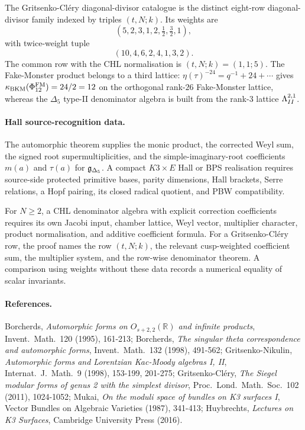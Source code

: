 The Gritsenko-Cl\'ery diagonal-divisor catalogue is the distinct
eight-row diagonal-divisor family indexed by triples \((t,N;k)\). Its
weights are
\[
  (5,2,3,1,2,\tfrac12,\tfrac32,1),
\]
with twice-weight tuple
\[
  (10,4,6,2,4,1,3,2).
\]
The common row with the CHL normalisation is \((t,N;k)=(1,1;5)\). The
Fake-Monster product belongs to a third lattice:
\(\eta(\tau)^{-24}=q^{-1}+24+\cdots\) gives
\(\kappa_{\mathrm{BKM}}(\Phi_{12}^{\mathrm{FM}})=24/2=12\) on the orthogonal
rank-\(26\) Fake-Monster lattice, whereas the \(\Delta_5\) type-II
denominator algebra is built from the rank-\(3\) lattice \(\Lambda^{2,1}_{II}\).

\paragraph{Hall source-recognition data.}
The automorphic theorem supplies the monic product, the corrected Weyl
sum, the signed root supermultiplicities, and the simple-imaginary-root
coefficients \(m(a)\) and \(\tau(a)\) for \(\mathfrak g_{\Delta_5}\). A compact
\(K3\times E\) Hall or BPS realisation requires source-side protected
primitive bases, parity dimensions, Hall brackets, Serre relations, a
Hopf pairing, its closed radical quotient, and PBW compatibility.

For \(N\geq2\), a CHL denominator algebra with explicit correction
coefficients requires its own Jacobi input, chamber lattice, Weyl
vector, multiplier character, product normalisation, and additive
coefficient formula. For a Gritsenko-Cl\'ery row, the proof names
the row \((t,N;k)\), the relevant cusp-weighted coefficient sum, the
multiplier system, and the row-wise denominator theorem. A comparison
using weights without these data records a numerical equality of scalar
invariants.

\paragraph{References.}
Borcherds, \emph{Automorphic forms on \(O_{s+2,2}(\mathbb R)\) and
infinite products}, Invent.\ Math.\ 120 (1995), 161-213; Borcherds,
\emph{The singular theta correspondence and automorphic forms},
Invent.\ Math.\ 132 (1998), 491-562; Gritsenko-Nikulin,
\emph{Automorphic forms and Lorentzian Kac-Moody algebras I, II},
Internat.\ J.\ Math.\ 9 (1998), 153-199, 201-275; Gritsenko-Cl\'ery,
\emph{The Siegel modular forms of genus 2 with the simplest divisor},
Proc.\ Lond.\ Math.\ Soc.\ 102 (2011), 1024-1052; Mukai,
\emph{On the moduli space of bundles on K3 surfaces I}, Vector Bundles
on Algebraic Varieties (1987), 341-413; Huybrechts, \emph{Lectures on
K3 Surfaces}, Cambridge University Press (2016).
